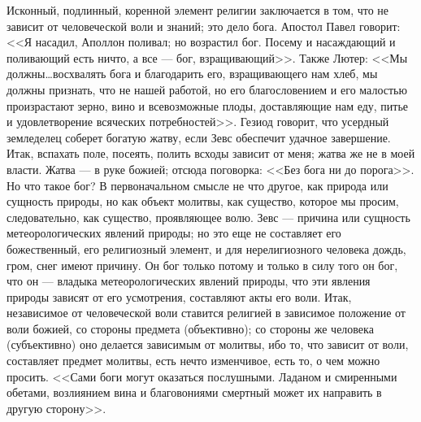 \documentclass[12pt]{article}
\begin{document}
Исконный, подлинный, коренной элемент религии заключается в том, что не зависит от человеческой воли и знаний; это дело бога. Апостол Павел говорит: <<Я насадил, Аполлон поливал; но возрастил бог. Посему и насаждающий и поливающий есть ничто, а все --- бог, взращивающий>>. Также Лютер: <<Мы должны\dots восхвалять бога и благодарить его, взращивающего нам хлеб, мы должны признать, что не нашей работой, но его благословением и его малостью произрастают зерно, вино и всевозможные плоды, доставляющие нам еду, питье и удовлетворение всяческих потребностей>>. Гезиод говорит, что усердный земледелец соберет богатую жатву, если Зевс обеспечит удачное завершение. Итак, вспахать поле, посеять, полить всходы зависит от меня; жатва же не в моей власти. Жатва --- в руке божией; отсюда поговорка: <<Без бога ни до порога>>. Но что такое бог? В первоначальном смысле не что другое, как природа или сущность природы, но как объект молитвы, как существо, которое мы просим, следовательно, как существо, проявляющее волю. Зевс --- причина или сущность метеорологических явлений природы; но это еще не составляет его божественный, его религиозный элемент, и для нерелигиозного человека дождь, гром, снег имеют причину. Он бог только потому и только в силу того он бог, что он --- владыка метеорологических явлений природы, что эти явления природы зависят от его усмотрения, составляют акты его воли. Итак, независимое от человеческой воли ставится религией в зависимое положение от воли божией, со стороны предмета (объективно); со стороны же человека (субъективно) оно делается зависимым от молитвы, ибо то, что зависит от воли, составляет предмет молитвы, есть нечто изменчивое, есть то, о чем можно просить. <<Сами боги могут оказаться послушными. Ладаном и смиренными обетами, возлиянием вина и благовониями смертный может их направить в другую сторону>>.

\section{}
\end{document}
